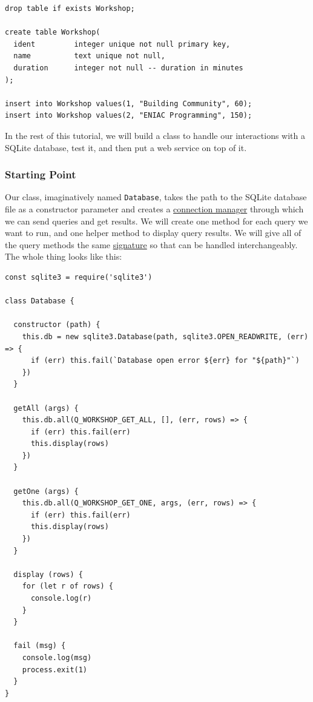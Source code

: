 \begin{verbatim}
drop table if exists Workshop;

create table Workshop(
  ident         integer unique not null primary key,
  name          text unique not null,
  duration      integer not null -- duration in minutes
);

insert into Workshop values(1, "Building Community", 60);
insert into Workshop values(2, "ENIAC Programming", 150);
\end{verbatim}

In the rest of this tutorial, we will build a class to handle our
interactions with a SQLite database, test it, and then put a web service
on top of it.

\subsubsection{Starting Point}\label{s:db-start}

Our class, imaginatively named \texttt{Database}, takes the path to the
SQLite database file as a constructor parameter and creates a
\protect\hyperlink{g:connection-manager}{connection manager} through
which we can send queries and get results. We will create one method for
each query we want to run, and one helper method to display query
results. We will give all of the query methods the same
\protect\hyperlink{g:signature}{signature} so that can be handled
interchangeably. The whole thing looks like this:

\begin{verbatim}
const sqlite3 = require('sqlite3')

class Database {

  constructor (path) {
    this.db = new sqlite3.Database(path, sqlite3.OPEN_READWRITE, (err) => {
      if (err) this.fail(`Database open error ${err} for "${path}"`)
    })
  }

  getAll (args) {
    this.db.all(Q_WORKSHOP_GET_ALL, [], (err, rows) => {
      if (err) this.fail(err)
      this.display(rows)
    })
  }

  getOne (args) {
    this.db.all(Q_WORKSHOP_GET_ONE, args, (err, rows) => {
      if (err) this.fail(err)
      this.display(rows)
    })
  }

  display (rows) {
    for (let r of rows) {
      console.log(r)
    }
  }

  fail (msg) {
    console.log(msg)
    process.exit(1)
  }
}
\end{verbatim}

